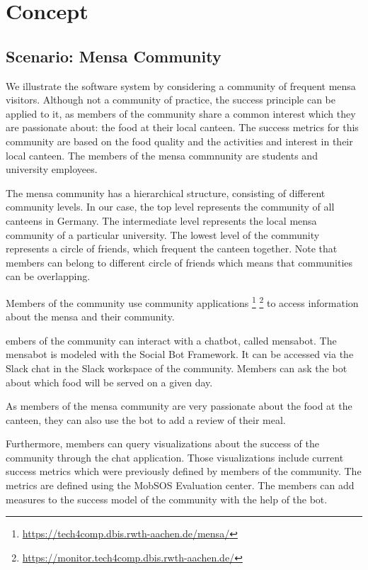 \chapter{Concept}\label{cha:concept}
\section{Scenario: Mensa Community}
We illustrate the software system by considering a community of frequent mensa visitors.
Although not a community of practice, the success principle can be applied to it, as members of the community share a common interest which they are passionate about: the food at their local canteen.
The success metrics for this community are based on the food quality and the activities and interest in their local canteen.
The members of the mensa commnunity are students and university employees.

The mensa community has a hierarchical structure, consisting of different community levels.
In our case, the top level represents the community of all canteens in Germany.
The intermediate level represents the local mensa community of a particular university.
The lowest level of the community represents a circle of friends, which frequent the canteen together. Note that members can belong to different circle of friends which means that communities can be overlapping.

Members of the community use community applications \footnote{\url{https://tech4comp.dbis.rwth-aachen.de/mensa/}}
\footnote{\url{https://monitor.tech4comp.dbis.rwth-aachen.de/}} to access information about the mensa and their community.

embers of the community can interact with a chatbot, called mensabot. The mensabot is modeled with  the Social Bot Framework. It can be accessed via the Slack chat in the Slack workspace of the community. Members can ask the bot about which food will be served on a given day.

As members of the mensa community are very passionate about the food at the canteen, they can also use the bot to add a review of their meal.

Furthermore, members can query visualizations about the success of the community through the chat application. Those visualizations include current success metrics which were previously defined by members of the community. The metrics are defined using the MobSOS Evaluation center. The members can add measures to the success model of the community with the help of the bot.

